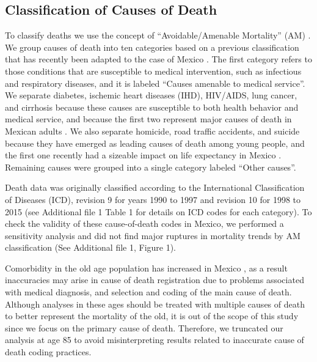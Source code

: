 \documentclass{bmcart}
\begin{document}
\subsection*{Classification of Causes of Death}
To classify deaths we use the concept of ``Avoidable/Amenable Mortality'' (AM) \cite{nolte&mckee2004, nolte&mckee2008}. We group causes of death into ten categories based on a previous classification  \cite{elo2014} that has recently been adapted to the case of Mexico \cite{Aburto2015}. The first category refers to those conditions that are susceptible to medical intervention, such as infectious and respiratory diseases, and it is labeled ``Causes amenable to medical service''. We separate diabetes, ischemic heart diseases (IHD), HIV/AIDS, lung
cancer, and cirrhosis because these causes are susceptible to both health behavior
and medical service, and because the first two represent major causes of death
in Mexican adults \cite{gomez2016dissonant}. We also separate
homicide, road traffic accidents, and suicide because they have emerged as
leading causes of death among young people, and the first one recently had a sizeable
impact on life expectancy in Mexico \cite{Aburto2015}. Remaining causes were grouped into a single category labeled ``Other causes''. 

Death data was originally classified according to the International Classification of Diseases (ICD), revision 9 for years 1990 to 1997 and revision 10 for 1998 to 2015 (see Additional file 1 Table 1 for details on ICD codes for each category). To check the validity of these cause-of-death codes in Mexico, we performed a sensitivity analysis and did not find major ruptures in mortality trends by AM classification (See Additional file 1, Figure 1).

Comorbidity in the old age population has increased in Mexico \cite{patel2006comorbidity}, as a result inaccuracies may arise in cause of death registration due to problems associated with medical diagnosis, and selection and coding of the main cause of death. Although analyses in these ages should be treated with multiple causes of death to better represent the mortality of the old, it is out of the scope of this study since we focus on the primary cause of death. Therefore, we truncated our analysis at age 85 to avoid misinterpreting results related to inaccurate cause of death coding practices.
\end{document}
